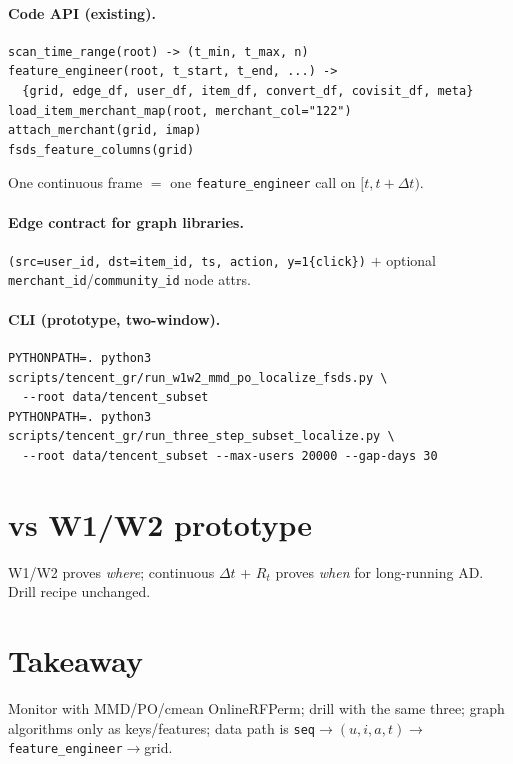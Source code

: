 \documentclass[11pt]{article}
\begin{document}
\paragraph{Code API (existing).}
\begin{verbatim}
scan_time_range(root) -> (t_min, t_max, n)
feature_engineer(root, t_start, t_end, ...) ->
  {grid, edge_df, user_df, item_df, convert_df, covisit_df, meta}
load_item_merchant_map(root, merchant_col="122")
attach_merchant(grid, imap)
fsds_feature_columns(grid)
\end{verbatim}
One continuous frame $=$ one \texttt{feature\_engineer} call on
$[t,t+\Delta t)$.

\paragraph{Edge contract for graph libraries.}
\texttt{(src=user\_id, dst=item\_id, ts, action, y=1\{click\})}
$+$ optional \texttt{merchant\_id}/\texttt{community\_id} node attrs.

\paragraph{CLI (prototype, two-window).}
\begin{verbatim}
PYTHONPATH=. python3 scripts/tencent_gr/run_w1w2_mmd_po_localize_fsds.py \
  --root data/tencent_subset
PYTHONPATH=. python3 scripts/tencent_gr/run_three_step_subset_localize.py \
  --root data/tencent_subset --max-users 20000 --gap-days 30
\end{verbatim}

\section{vs W1/W2 prototype}
W1/W2 proves \emph{where}; continuous $\Delta t$ + $R_t$ proves
\emph{when} for long-running AD. Drill recipe unchanged.

\section{Takeaway}
Monitor with MMD/PO/cmean OnlineRFPerm; drill with the same three;
graph algorithms only as keys/features; data path is
\texttt{seq}$\to(u,i,a,t)\to$\texttt{feature\_engineer}$\to$grid.
\end{document}
